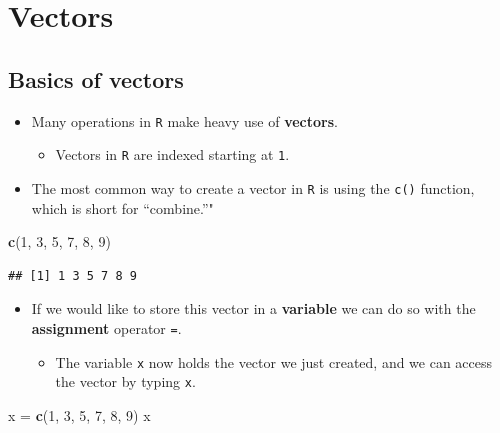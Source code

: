 \documentclass[]{book}
\newenvironment{Shaded}{\begin{snugshade}}{\end{snugshade}}
\newcommand{\KeywordTok}[1]{\textcolor[rgb]{0.13,0.29,0.53}{\textbf{#1}}}
\newcommand{\DecValTok}[1]{\textcolor[rgb]{0.00,0.00,0.81}{#1}}
\newcommand{\StringTok}[1]{\textcolor[rgb]{0.31,0.60,0.02}{#1}}
\newcommand{\NormalTok}[1]{#1}
\providecommand{\tightlist}{%
  \setlength{\itemsep}{0pt}\setlength{\parskip}{0pt}}
\begin{document}
\section{Vectors}\label{vectors}

\subsection{Basics of vectors}\label{basics-of-vectors}

\begin{itemize}
\tightlist
\item
  Many operations in \texttt{R} make heavy use of \textbf{vectors}.

  \begin{itemize}
  \tightlist
  \item
    Vectors in \texttt{R} are indexed starting at \texttt{1}.
  \end{itemize}
\item
  The most common way to create a vector in \texttt{R} is using the
  \texttt{c()} function, which is short for ``combine.''"
\end{itemize}

\begin{Shaded}
\begin{Highlighting}[]
\KeywordTok{c}\NormalTok{(}\DecValTok{1}\NormalTok{, }\DecValTok{3}\NormalTok{, }\DecValTok{5}\NormalTok{, }\DecValTok{7}\NormalTok{, }\DecValTok{8}\NormalTok{, }\DecValTok{9}\NormalTok{)}
\end{Highlighting}
\end{Shaded}

\begin{verbatim}
## [1] 1 3 5 7 8 9
\end{verbatim}

\begin{itemize}
\tightlist
\item
  If we would like to store this vector in a \textbf{variable} we can do
  so with the \textbf{assignment} operator \texttt{=}.

  \begin{itemize}
  \tightlist
  \item
    The variable \texttt{x} now holds the vector we just created, and we
    can access the vector by typing \texttt{x}.
  \end{itemize}
\end{itemize}

\begin{Shaded}
\begin{Highlighting}[]
\NormalTok{x =}\StringTok{ }\KeywordTok{c}\NormalTok{(}\DecValTok{1}\NormalTok{, }\DecValTok{3}\NormalTok{, }\DecValTok{5}\NormalTok{, }\DecValTok{7}\NormalTok{, }\DecValTok{8}\NormalTok{, }\DecValTok{9}\NormalTok{)}
\NormalTok{x}
\end{Highlighting}
\end{Shaded}
\end{document}
